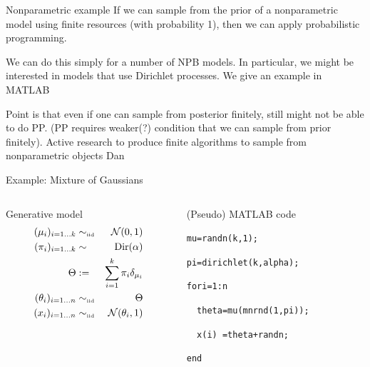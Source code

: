 \begin{frame}{Nonparametric example}
If we can sample from the prior of a nonparametric model using finite resources (with probability 1), then we can apply probabilistic programming.
\newline

We can do this simply for a number of NPB models. In particular, we might be interested in models that use Dirichlet processes. We give an example in MATLAB
\newline

Point is that even if one can sample from posterior finitely, still might not be able to do PP. (PP requires weaker(?) condition that we can sample from prior finitely). Active research to produce finite algorithms to sample from nonparametric objects \eg Dan
\end{frame}

\begin{frame}{Example: Mixture of Gaussians}
  \begin{columns}
    \begin{column}{.5\textwidth}
      \begin{block}{Generative model}
        \begin{eqnarray*}
          (\mu_i)_{i=1\ldots k} & \sim_{\mbox{\tiny iid}} & \mathcal{N}(0, 1) \\
          (\pi_i)_{i=1\ldots k} & \sim & \textrm{Dir}(\alpha) \\
          \Theta & := & \sum_{i=1}^k \pi_i \delta_{\mu_i} \\
          (\theta_i)_{i=1\ldots n} & \sim_{\mbox{\tiny iid}} & \Theta \\
          (x_i)_{i=1\ldots n} & \sim_{\mbox{\tiny iid}} & \mathcal{N}(\theta_i, 1)
        \end{eqnarray*}
      \end{block}
    \end{column}
    \begin{column}{.5\textwidth}
      \begin{block}{(Pseudo) MATLAB code}
        \vspace{0.75\baselineskip}
        \begin{alltt}
          mu = randn(k,1);

          pi = dirichlet(k, alpha);


          for i = 1:n
            
          \ \ theta = mu(mnrnd(1,pi));
          
          \ \ x(i) \ = theta + randn;
            
          end
        \end{alltt}
        \vspace{0.75\baselineskip}
      \end{block}
    \end{column}
  \end{columns}
\end{frame}

